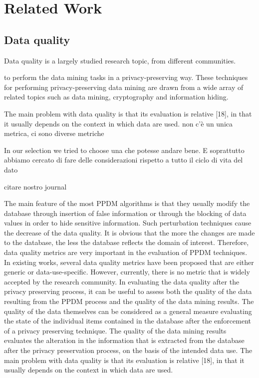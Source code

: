 \section{Related Work}\label{sec:related}

\subsection{Data quality}

Data quality is a largely studied research topic, from different communities. 

to perform the data mining tasks in
a privacy-preserving way. These techniques for performing privacy-preserving
data mining are drawn from a wide array of related topics such as data mining,
cryptography and information hiding.

The main problem with data quality is that its evaluation is relative [18], in
that it usually depends on the context in which data are used.
non c'è un unica metrica, ci sono diverse metriche 

In our selection we tried to choose una che potesse andare bene. E soprattutto abbiamo cercato di fare delle considerazioni rispetto a tutto il ciclo di vita del dato

citare nostro journal


The main feature of the most PPDM algorithms is that they usually modify
the database through insertion of false information or through the blocking of
data values in order to hide sensitive information. Such perturbation techniques
cause the decrease of the data quality. It is obvious that the more the changes
are made to the database, the less the database reflects the domain of interest.
Therefore, data quality metrics are very important in the evaluation of PPDM
techniques.
In existing works, several data quality metrics have been proposed that are
either generic or data-use-specific. However, currently, there is no metric that
is widely accepted by the research community.
In evaluating the data quality after the privacy preserving process, it can be
useful to assess both the quality of the data resulting from the PPDM process
and the quality of the data mining results.
The quality of the data themselves
can be considered as a general measure evaluating the state of the individual
items contained in the database after the enforcement of a privacy preserving
technique. The quality of the data mining results evaluates the alteration in the
information that is extracted from the database after the privacy preservation
process, on the basis of the intended data use.
The main problem with data quality is that its evaluation is relative [18], in
that it usually depends on the context in which data are used.

